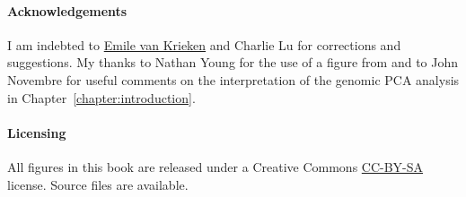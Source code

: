 \documentclass{pca}
\theoremstyle{theorem}
\theoremstyle{proof}
\begin{document}
\paragraph{Acknowledgements} I am indebted to \href{https://emilevankrieken.com/}{Emile van Krieken} and Charlie Lu for corrections and suggestions. My thanks to Nathan Young for the use of a figure from \citep{young2015fossil} and to John Novembre for useful comments on the interpretation of the genomic PCA analysis in Chapter~\ref{chapter:introduction}.

\paragraph{Licensing} All figures in this book are released under a Creative Commons \href{https://creativecommons.org/licenses/by-sa/2.0/}{CC-BY-SA} license. Source files are available.



















\appendix




\pagestyle{empty}

\printindex
\end{document}
